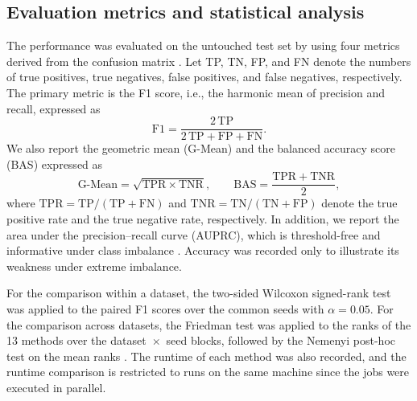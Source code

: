 \documentclass[10pt,a4paper]{article}
\begin{document}
\subsection{Evaluation metrics and statistical analysis}
The performance was evaluated on the untouched test set by using four
metrics derived from the confusion matrix \citep{cahyana2019improving}.
Let TP, TN, FP, and FN denote the numbers of true positives, true
negatives, false positives, and false negatives, respectively. The
primary metric is the F1 score, i.e., the harmonic mean of precision and
recall, expressed as
\begin{equation}
  \mathrm{F1} = \frac{2\,\mathrm{TP}}
  {2\,\mathrm{TP} + \mathrm{FP} + \mathrm{FN}}.
  \label{eq:f1}
\end{equation}
We also report the geometric mean (G-Mean) and the balanced accuracy
score (BAS) expressed as
\begin{equation}
  \text{G-Mean} = \sqrt{\mathrm{TPR} \times \mathrm{TNR}},
  \qquad
  \mathrm{BAS} = \frac{\mathrm{TPR} + \mathrm{TNR}}{2},
  \label{eq:gmean_bas}
\end{equation}
where $\mathrm{TPR} = \mathrm{TP}/(\mathrm{TP}+\mathrm{FN})$ and
$\mathrm{TNR} = \mathrm{TN}/(\mathrm{TN}+\mathrm{FP})$ denote the
true positive rate and the true negative rate, respectively. In
addition, we report the area under the precision--recall curve (AUPRC),
which is threshold-free and informative under class imbalance
\citep{saito2015precision}. Accuracy was recorded only to illustrate
its weakness under extreme imbalance.

For the comparison within a dataset, the two-sided Wilcoxon signed-rank
test was applied to the paired F1 scores over the common seeds with
$\alpha = 0.05$. For the comparison across datasets, the Friedman test
was applied to the ranks of the 13 methods over the
dataset~$\times$~seed blocks, followed by the Nemenyi post-hoc test on
the mean ranks \citep{demsar2006statistical}. The runtime of each
method was also recorded, and the runtime comparison is restricted to
runs on the same machine since the jobs were executed in parallel.
\end{document}
